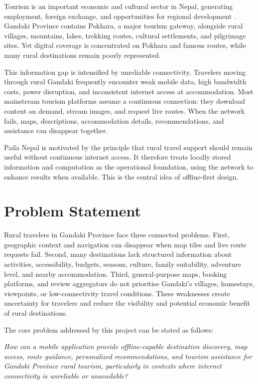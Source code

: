 \documentclass[12pt,a4paper,oneside]{report}
\begin{document}
Tourism is an important economic and cultural sector in Nepal, generating employment, foreign exchange, and opportunities for regional development \parencite{NepalTourism2023}. Gandaki Province contains Pokhara, a major tourism gateway, alongside rural villages, mountains, lakes, trekking routes, cultural settlements, and pilgrimage sites. Yet digital coverage is concentrated on Pokhara and famous routes, while many rural destinations remain poorly represented.

This information gap is intensified by unreliable connectivity. Travelers moving through rural Gandaki frequently encounter weak mobile data, high bandwidth costs, power disruption, and inconsistent internet access at accommodation. Most mainstream tourism platforms assume a continuous connection: they download content on demand, stream images, and request live routes. When the network fails, maps, descriptions, accommodation details, recommendations, and assistance can disappear together.

Paila Nepal is motivated by the principle that rural travel support should remain useful without continuous internet access. It therefore treats locally stored information and computation as the operational foundation, using the network to enhance results when available. This is the central idea of offline-first design.

\section{Problem Statement}
\label{sec:problem}

Rural travelers in Gandaki Province face three connected problems. First, geographic context and navigation can disappear when map tiles and live route requests fail. Second, many destinations lack structured information about activities, accessibility, budgets, seasons, culture, family suitability, adventure level, and nearby accommodation. Third, general-purpose maps, booking platforms, and review aggregators do not prioritise Gandaki's villages, homestays, viewpoints, or low-connectivity travel conditions. These weaknesses create uncertainty for travelers and reduce the visibility and potential economic benefit of rural destinations.

The core problem addressed by this project can be stated as follows:

\begin{center}
\textit{How can a mobile application provide offline-capable destination discovery, map access, route guidance, personalized recommendations, and tourism assistance for Gandaki Province rural tourism, particularly in contexts where internet connectivity is unreliable or unavailable?}
\end{center}
\end{document}
